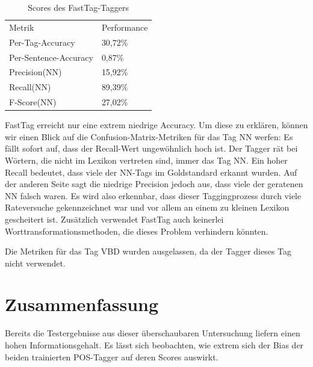 \begin{table}[htb]
\centering
\captionsetup{justification=centering,margin=2cm}
\begin{tabular}{l|l}
Metrik & Performance \\
\cline{1-2}
Per-Tag-Accuracy & 30,72\% \\
Per-Sentence-Accuracy & 0,87\%\\
\cline{1-2}
Precision(NN) & 15,92\%\\
Recall(NN) & 89,39\%\\
F-Score(NN) & 27,02\%\\


\end{tabular}
\vspace{3mm}
\caption{Scores des FastTag-Taggers}
\label{tab:eval:detail:fasttag}
\end{table}

FastTag erreicht nur eine extrem niedrige Accuracy. Um diese zu erklären, können wir einen Blick auf die Confusion-Matrix-Metriken für das Tag NN werfen: Es fällt sofort auf, dass der Recall-Wert ungewöhnlich hoch ist. Der Tagger rät bei Wörtern, die nicht im Lexikon vertreten sind, immer das Tag \textsc{NN}. Ein hoher Recall bedeutet, dass viele der NN-Tags im Goldstandard erkannt wurden. Auf der anderen Seite sagt die niedrige Precision jedoch aus, dass viele der geratenen NN falsch waren. Es wird also erkennbar, dass dieser Taggingprozess durch viele Rateversuche gekennzeichnet war und vor allem an einem zu kleinen Lexikon gescheitert ist. Zusätzlich verwendet FastTag auch keinerlei Worttransformationsmethoden, die dieses Problem verhindern könnten.

Die Metriken für das Tag \textsc{VBD} wurden ausgelassen, da der Tagger dieses Tag nicht verwendet.

\section{Zusammenfassung}
\label{sec:eval:conclusion}

Bereits die Testergebnisse aus dieser überschaubaren Untersuchung liefern einen hohen Informationsgehalt. Es lässt sich beobachten, wie extrem sich der Bias der beiden trainierten POS-Tagger auf deren Scores auswirkt.

